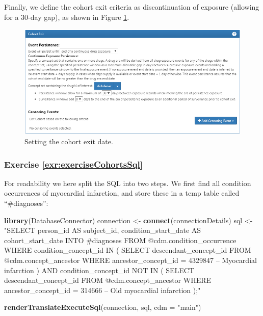 \documentclass[11pt]{book}
\newenvironment{Shaded}{\begin{snugshade}}{\end{snugshade}}
\newcommand{\KeywordTok}[1]{\textcolor[rgb]{0.13,0.29,0.53}{\textbf{#1}}}
\newcommand{\DataTypeTok}[1]{\textcolor[rgb]{0.13,0.29,0.53}{#1}}
\newcommand{\StringTok}[1]{\textcolor[rgb]{0.31,0.60,0.02}{#1}}
\newcommand{\NormalTok}[1]{#1}
\theoremstyle{definition}
\theoremstyle{definition}
\theoremstyle{definition}
\theoremstyle{remark}
\begin{document}
Finally, we define the cohort exit criteria as discontinuation of
exposure (allowing for a 30-day gap), as shown in Figure
\ref{fig:cohortsAtlasExit}.

\begin{figure}

{\centering \includegraphics[width=1\linewidth]{images/SuggestedAnswers/cohortsAtlasExit} 

}

\caption{Setting the cohort exit date.}\label{fig:cohortsAtlasExit}
\end{figure}

\subsubsection*{Exercise
\ref{exr:exerciseCohortsSql}}\label{exercise-refexrexercisecohortssql}

For readability we here split the SQL into two steps. We first find all
condition occurrences of myocardial infarction, and store these in a
temp table called ``\#diagnoses'':

\begin{Shaded}
\begin{Highlighting}[]
\KeywordTok{library}\NormalTok{(DatabaseConnector)}
\NormalTok{connection <-}\StringTok{ }\KeywordTok{connect}\NormalTok{(connectionDetails)}
\NormalTok{sql <-}\StringTok{ "SELECT person_id AS subject_id,}
\StringTok{  condition_start_date AS cohort_start_date}
\StringTok{INTO #diagnoses}
\StringTok{FROM @cdm.condition_occurrence}
\StringTok{WHERE condition_concept_id IN (}
\StringTok{    SELECT descendant_concept_id}
\StringTok{    FROM @cdm.concept_ancestor}
\StringTok{    WHERE ancestor_concept_id = 4329847 -- Myocardial infarction}
\StringTok{)}
\StringTok{  AND condition_concept_id NOT IN (}
\StringTok{    SELECT descendant_concept_id}
\StringTok{    FROM @cdm.concept_ancestor}
\StringTok{    WHERE ancestor_concept_id = 314666 -- Old myocardial infarction}
\StringTok{);"}

\KeywordTok{renderTranslateExecuteSql}\NormalTok{(connection, sql, }\DataTypeTok{cdm =} \StringTok{"main"}\NormalTok{)}
\end{Highlighting}
\end{Shaded}
\end{document}
